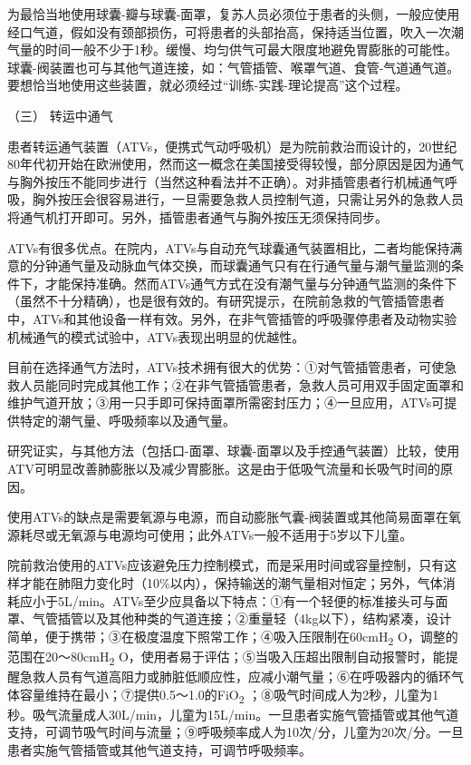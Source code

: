 为最恰当地使用球囊-瓣与球囊-面罩，复苏人员必须位于患者的头侧，一般应使用经口气道，假如没有颈部损伤，可将患者的头部抬高，保持适当位置，吹入一次潮气量的时间一般不少于1秒。缓慢、均匀供气可最大限度地避免胃膨胀的可能性。球囊-阀装置也可与其他气道连接，如：气管插管、喉罩气道、食管-气道通气道。要想恰当地使用这些装置，就必须经过“训练-实践-理论提高”这个过程。

\hypertarget{text00284.htmlux5cux23CHP10-1-5-3-3}{}
（三） 转运中通气

患者转运通气装置（ATVs，便携式气动呼吸机）是为院前救治而设计的，20世纪80年代初开始在欧洲使用，然而这一概念在美国接受得较慢，部分原因是因为通气与胸外按压不能同步进行（当然这种看法并不正确）。对非插管患者行机械通气呼吸，胸外按压会很容易进行，一旦需要急救人员控制气道，只需让另外的急救人员将通气机打开即可。另外，插管患者通气与胸外按压无须保持同步。

ATVs有很多优点。在院内，ATVs与自动充气球囊通气装置相比，二者均能保持满意的分钟通气量及动脉血气体交换，而球囊通气只有在行通气量与潮气量监测的条件下，才能保持准确。然而ATVs通气方式在没有潮气量与分钟通气监测的条件下（虽然不十分精确），也是很有效的。有研究提示，在院前急救的气管插管患者中，ATVs和其他设备一样有效。另外，在非气管插管的呼吸骤停患者及动物实验机械通气的模式试验中，ATVs表现出明显的优越性。

目前在选择通气方法时，ATVs技术拥有很大的优势：①对气管插管患者，可使急救人员能同时完成其他工作；②在非气管插管患者，急救人员可用双手固定面罩和维护气道开放；③用一只手即可保持面罩所需密封压力；④一旦应用，ATVs可提供特定的潮气量、呼吸频率以及通气量。

研究证实，与其他方法（包括口-面罩、球囊-面罩以及手控通气装置）比较，使用ATV可明显改善肺膨胀以及减少胃膨胀。这是由于低吸气流量和长吸气时间的原因。

使用ATVs的缺点是需要氧源与电源，而自动膨胀气囊-阀装置或其他简易面罩在氧源耗尽或无氧源与电源均可使用；此外ATVs一般不适用于5岁以下儿童。

院前救治使用的ATVs应该避免压力控制模式，而是采用时间或容量控制，只有这样才能在肺阻力变化时（10\%以内），保持输送的潮气量相对恒定；另外，气体消耗应小于5L/min。ATVs至少应具备以下特点：①有一个轻便的标准接头可与面罩、气管插管以及其他种类的气道连接；②重量轻（4kg以下），结构紧凑，设计简单，便于携带；③在极度温度下照常工作；④吸入压限制在60cmH\textsubscript{2}
O，调整的范围在20～80cmH\textsubscript{2}
O，使用者易于评估；⑤当吸入压超出限制自动报警时，能提醒急救人员有气道高阻力或肺脏低顺应性，应减小潮气量；⑥在呼吸器内的循环气体容量维持在最小；⑦提供0.5～1.0的FiO\textsubscript{2}
；⑧吸气时间成人为2秒，儿童为1秒。吸气流量成人30L/min，儿童为15L/min。一旦患者实施气管插管或其他气道支持，可调节吸气时间与流量；⑨呼吸频率成人为10次/分，儿童为20次/分。一旦患者实施气管插管或其他气道支持，可调节呼吸频率。

